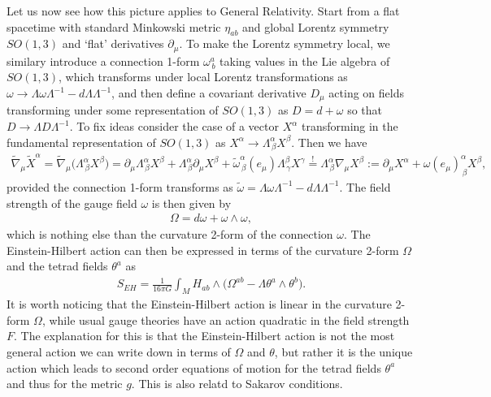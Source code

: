 Let us now see how this picture applies to General Relativity.
Start from a flat spacetime with standard Minkowski metric $\eta_{ab}$ and global Lorentz symmetry $SO(1,3)$ and `flat' derivatives $\partial_\mu$.
To make the Lorentz symmetry local, we similary introduce a connection 1-form $\omega^a_{\, b}$ taking values in the Lie algebra of $SO(1,3)$, which transforms under local Lorentz transformations as $\omega \to \Lambda \omega \Lambda^{-1} - d\Lambda \Lambda^{-1}$, and then define a covariant derivative $D_\mu$ acting on fields transforming under some representation of $SO(1,3)$ as $D = d +\omega $ so that $D \to \Lambda D \Lambda^{-1}$.
To fix ideas consider the case of a vector $X^\alpha$ transforming in the fundamental representation of $SO(1,3)$ as $X^\alpha \to \Lambda^\alpha_{\, \beta} X^\beta$.
Then we have
\begin{align}
    \tilde{\nabla}_\mu \tilde{X}^\alpha = \tilde{\nabla}_\mu \big(\Lambda^\alpha_{\, \beta} X^\beta\big) 
    = \partial_\mu \Lambda^\alpha_{\, \beta} X^\beta + \Lambda^\alpha_{\, \beta} \partial_\mu X^\beta + \tilde{\omega}^\alpha_{\,\beta}(e_\mu) \Lambda^\beta_{\, \gamma} X^\gamma
    \overset{!}{=}\Lambda^\alpha_{\, \beta} \nabla_\mu X^\beta := \partial_\mu X^\alpha + \omega(e_\mu)^\alpha_{\, \beta} X^\beta,
\end{align}
provided the connection 1-form transforms as $\tilde{\omega} = \Lambda \omega \Lambda^{-1} - d\Lambda \Lambda^{-1}$.
The field strength of the gauge field $\omega$ is then given by
\begin{align}
    \Omega = d\omega + \omega \wedge \omega,
\end{align}
which is nothing else than the curvature 2-form of the connection $\omega$.
The Einstein-Hilbert action can then be expressed in terms of the curvature 2-form $\Omega$ and the tetrad fields $\theta^a$ as
\begin{align}
    S_{EH} = \frac{1}{16\pi G}\int_M H_{ab}\wedge \Big( \Omega^{ab} - \Lambda \theta^a \wedge \theta^b\Big).
\end{align}
It is worth noticing that the Einstein-Hilbert action is linear in the curvature 2-form $\Omega$, while usual gauge theories have an action quadratic in the field strength $F$.
The explanation for this is that the Einstein-Hilbert action is not the most general action we can write down in terms of $\Omega$ and $\theta$, but rather it is the unique action which leads to second order equations of motion for the tetrad fields $\theta^a$ and thus for the metric $g$.
This is also relatd to Sakarov conditions.


